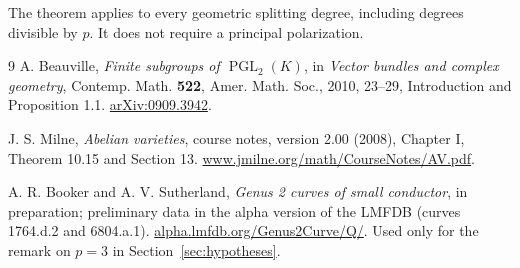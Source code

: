 \documentclass[11pt]{article}
\DeclareMathOperator{\PGL}{PGL}
\begin{document}
The theorem applies to every geometric splitting degree, including
degrees divisible by \(p\). It does not require a principal
polarization.

\begin{thebibliography}{9}
A. Beauville,
\emph{Finite subgroups of \(\PGL_2(K)\)}, in \emph{Vector bundles and
complex geometry}, Contemp. Math. \textbf{522}, Amer. Math. Soc., 2010,
23--29, Introduction and Proposition 1.1.
\href{https://arxiv.org/abs/0909.3942}{arXiv:0909.3942}.

J. S. Milne,
\emph{Abelian varieties}, course notes, version 2.00 (2008), Chapter I,
Theorem 10.15 and Section 13.
\href{https://www.jmilne.org/math/CourseNotes/AV.pdf}{www.jmilne.org/math/CourseNotes/AV.pdf}.

A. R. Booker and A. V. Sutherland,
\emph{Genus 2 curves of small conductor}, in preparation; preliminary
data in the alpha version of the LMFDB (curves 1764.d.2 and 6804.a.1).
\href{https://alpha.lmfdb.org/Genus2Curve/Q/}{alpha.lmfdb.org/Genus2Curve/Q/}.
Used only for the remark on \(p=3\) in Section~\ref{sec:hypotheses}.
\end{thebibliography}
\end{document}
